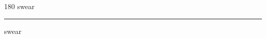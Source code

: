 
\begin{frame}
\begin{center}
\begin{turn}{180}
{\fontsize{2.5cm}{1em}\selectfont swear}
\end{turn}
\vspace{1em}\par  
\hrule
\vspace{1em}\par  
{\fontsize{2.5cm}{1em}\selectfont swear}
\end{center}
\end{frame}
